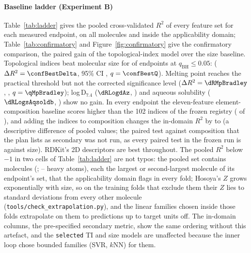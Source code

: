 \documentclass[preprint,12pt]{elsarticle}
\begin{document}
\paragraph{Baseline ladder (Experiment B)} Table~\ref{tab:ladder} gives the pooled cross-validated $R^2$ of every feature set for each measured endpoint, on all molecules and inside the applicability domain; Table~\ref{tab:confirmatory} and Figure~\ref{fig:confirmatory} give the confirmatory comparison, the paired gain of the topological-index model over the size baseline. Topological indices beat molecular size for \confNInformative{} of \confNTargets{} endpoints at $q_{\mathrm{BH}}\le0.05$: \confBestTarget{} ($\Delta R^2=\confBestDelta$, 95\% CI \confBestCI, $q=\confBestQ$). Melting point reaches the practical threshold but not the corrected significance level ($\Delta R^2=\dRMpBradley$, \ciMpBradley, $q=\qMpBradley$); log\,D$_{7.4}$ ($\dRLogdAz$, \ciLogdAz) and aqueous solubility ($\dRLogsAqsoldb$, \ciLogsAqsoldb) show no gain. In every endpoint the eleven-feature element-composition baseline scores higher than the 102 indices of the frozen registry (\ladderNCompositionAboveTI{} of \ladderNTargets), and adding the indices to composition changes the in-domain $R^2$ by \ladderMinTIcompGainInDomain{} to \ladderMaxTIcompGainInDomain{} (a descriptive difference of pooled values; the paired test against composition that the plan lists as secondary was not run, as every paired test in the frozen run is against size). RDKit's 2D descriptors are best throughout. The pooled $R^2$ below $-1$ in two cells of Table~\ref{tab:ladder} are not typos: the pooled set contains \extrapNMolecules{} molecules (\extrapNames; \extrapMinHeavy--\extrapMaxHeavy{} heavy atoms), each the largest or second-largest molecule of its endpoint's set, that the applicability domain flags in every fold; Hosoya's $Z$ grows exponentially with size, so on the training folds that exclude them their $Z$ lies \extrapMinZZ{} to \extrapMaxZ{} standard deviations from every other molecule (\texttt{tools/check\_extrapolation.py}), and the linear families chosen inside those folds extrapolate on them to predictions up to \extrapMaxResidual{} target units off. The in-domain columns, the pre-specified secondary metric, show the same ordering without this artefact, and the \texttt{selected} TI and size models are unaffected because the inner loop chose bounded families (SVR, $k$NN) for them.
\end{document}
